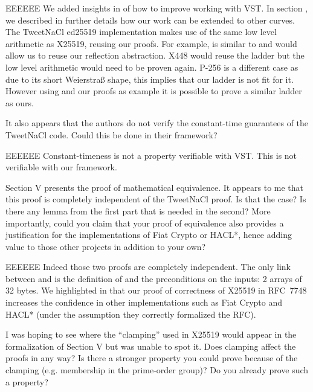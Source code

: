 \begin{answer}{EEEEEE}
We added insights in  of how to improve
working with VST. In section ,
we described in further details how our work can
be extended to other curves. The TweetNaCl ed25519
implementation makes use of the same low level arithmetic
as X25519, reusing our proofs. For example,  is
similar to  and would allow us to reuse our
reflection abstraction. X448 would reuse the ladder but the
low level arithmetic would need to be proven again. P-256
is a different case as due to its short Weierstra\ss{} shape, this
implies that our ladder is not fit for it. However using \cite{BartziaS14}
and our proofs as example it is possible to prove a similar
ladder as ours.
\end{answer}

It also appears that the authors do not verify the constant-time
guarantees of the TweetNaCl code. Could this be done
in their framework?

\begin{answer}{EEEEEE}
Constant-timeness is not a property verifiable with VST.
This is not verifiable with our framework.
\end{answer}

Section V presents the proof of mathematical equivalence.
It appears to me that this proof is completely independent of
the TweetNaCl proof. Is that the case? Is there any lemma
from the first part that is needed in the second? More
importantly, could you claim that your proof of equivalence also
provides a justification for the implementations of Fiat Crypto
or HACL*, hence adding value to those other projects in addition
to your own?

\begin{answer}{EEEEEE}
Indeed those two proofs are completely independent. The
only link between  and  is the definition
of  and the preconditions on the inputs: 2 arrays of
32 bytes. We highlighted in  that our proof of
correctness of X25519 in RFC~7748 increases the confidence
in other implementations such as Fiat Crypto and HACL*
(under the assumption they correctly formalized the RFC).
\end{answer}

I was hoping to see where the ``clamping'' used in X25519
would appear in the formalization of Section V but was unable
to spot it. Does clamping affect the proofs in any way? Is there
a stronger property you could prove because of the clamping
(e.g. membership in the prime-order group)? Do you already
prove such a property?

